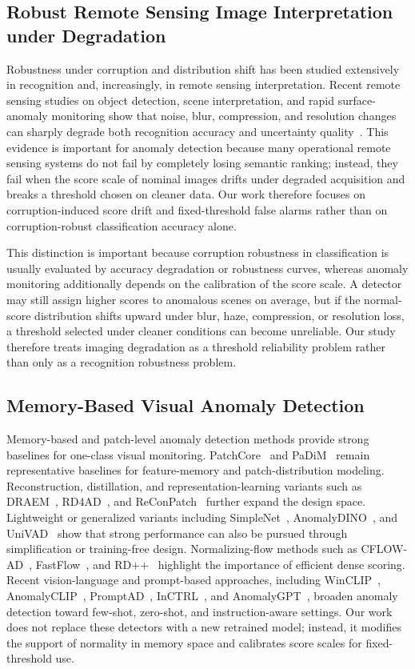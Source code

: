 \documentclass[remotesensing,article,submit,pdftex,moreauthors]{Definitions/mdpi}
\begin{document}
\subsection{Robust Remote Sensing Image Interpretation under Degradation}
Robustness under corruption and distribution shift has been studied extensively in recognition and, increasingly, in remote sensing interpretation. Recent remote sensing studies on object detection, scene interpretation, and rapid surface-anomaly monitoring show that noise, blur, compression, and resolution changes can sharply degrade both recognition accuracy and uncertainty quality~\cite{rsyolorobust,rsuda,realtimessa}. This evidence is important for anomaly detection because many operational remote sensing systems do not fail by completely losing semantic ranking; instead, they fail when the score scale of nominal images drifts under degraded acquisition and breaks a threshold chosen on cleaner data. Our work therefore focuses on corruption-induced score drift and fixed-threshold false alarms rather than on corruption-robust classification accuracy alone.

This distinction is important because corruption robustness in classification is usually evaluated by accuracy degradation or robustness curves, whereas anomaly monitoring additionally depends on the calibration of the score scale. A detector may still assign higher scores to anomalous scenes on average, but if the normal-score distribution shifts upward under blur, haze, compression, or resolution loss, a threshold selected under cleaner conditions can become unreliable. Our study therefore treats imaging degradation as a threshold reliability problem rather than only as a recognition robustness problem.

\subsection{Memory-Based Visual Anomaly Detection}
Memory-based and patch-level anomaly detection methods provide strong baselines for one-class visual monitoring. PatchCore~\cite{patchcore} and PaDiM~\cite{padim} remain representative baselines for feature-memory and patch-distribution modeling. Reconstruction, distillation, and representation-learning variants such as DRAEM~\cite{draem}, RD4AD~\cite{rd4ad}, and ReConPatch~\cite{reconpatch} further expand the design space. Lightweight or generalized variants including SimpleNet~\cite{simplenet}, AnomalyDINO~\cite{anomalydino}, and UniVAD~\cite{univad} show that strong performance can also be pursued through simplification or training-free design. Normalizing-flow methods such as CFLOW-AD~\cite{cflowad}, FastFlow~\cite{fastflow}, and RD++~\cite{rdpp} highlight the importance of efficient dense scoring. Recent vision-language and prompt-based approaches, including WinCLIP~\cite{winclip}, AnomalyCLIP~\cite{anomalyclipiclr}, PromptAD~\cite{promptad}, InCTRL~\cite{inctrl}, and AnomalyGPT~\cite{anomalygpt}, broaden anomaly detection toward few-shot, zero-shot, and instruction-aware settings. Our work does not replace these detectors with a new retrained model; instead, it modifies the support of normality in memory space and calibrates score scales for fixed-threshold use.
\end{document}

